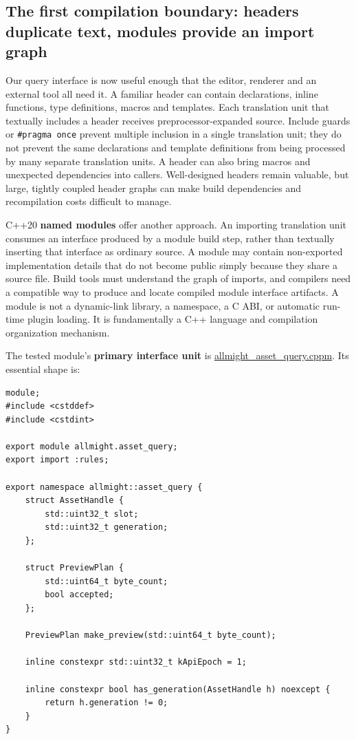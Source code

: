 \subsection{The first compilation boundary: headers duplicate text, modules provide an import graph}\label{01-foundations-i-ch006-the-first-compilation-boundary-headers-duplicate-text-modules-provide-an-import-graph}

Our query interface is now useful enough that the editor, renderer and an external tool all need it. A familiar header can contain declarations, inline functions, type definitions, macros and templates. Each translation unit that textually includes a header receives preprocessor-expanded source. Include guards or \texttt{\#pragma\ once} prevent multiple inclusion in a single translation unit; they do not prevent the same declarations and template definitions from being processed by many separate translation units. A header can also bring macros and unexpected dependencies into callers. Well-designed headers remain valuable, but large, tightly coupled header graphs can make build dependencies and recompilation costs difficult to manage.

C++20 \textbf{named modules} offer another approach. An importing translation unit consumes an interface produced by a module build step, rather than textually inserting that interface as ordinary source. A module may contain non-exported implementation details that do not become public simply because they share a source file. Build tools must understand the graph of imports, and compilers need a compatible way to produce and locate compiled module interface artifacts. A module is not a dynamic-link library, a namespace, a C ABI, or automatic run-time plugin loading. It is fundamentally a C++ language and compilation organization mechanism.

The tested module's \textbf{primary interface unit} is \hyperref[source-file-453ba365bb56ed2f6e4c3f8e]{allmight\_asset\_query.cppm}. Its essential shape is:

\begin{verbatim}
module;
#include <cstddef>
#include <cstdint>

export module allmight.asset_query;
export import :rules;

export namespace allmight::asset_query {
    struct AssetHandle {
        std::uint32_t slot;
        std::uint32_t generation;
    };

    struct PreviewPlan {
        std::uint64_t byte_count;
        bool accepted;
    };

    PreviewPlan make_preview(std::uint64_t byte_count);

    inline constexpr std::uint32_t kApiEpoch = 1;

    inline constexpr bool has_generation(AssetHandle h) noexcept {
        return h.generation != 0;
    }
}
\end{verbatim}

